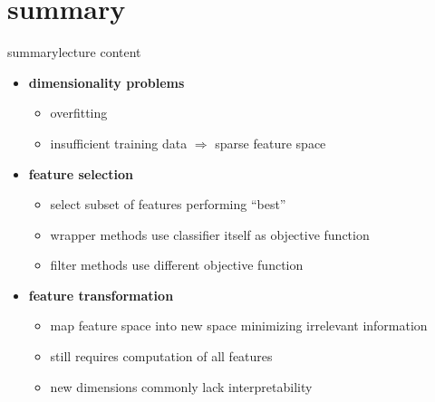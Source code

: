         
        
        
        
    \section{summary}
        \begin{frame}{summary}{lecture content}
            \begin{itemize}
                \item   \textbf{dimensionality problems}
                    \begin{itemize}
                        \item   overfitting
                        \item   insufficient training data $\Rightarrow$ sparse feature space
                    \end{itemize}
                \bigskip
                \item   \textbf{feature selection}
                    \begin{itemize}
                        \item   select subset of features performing ``best''
                        \item   wrapper methods use classifier itself as objective function
                        \item   filter methods use different objective function
                    \end{itemize}
                \bigskip
                \item   \textbf{feature transformation}
                    \begin{itemize}
                        \item   map feature space into new space minimizing irrelevant information
                        \item   still requires computation of all features
                        \item   new dimensions commonly lack interpretability
                    \end{itemize}
            \end{itemize}
        \end{frame}


